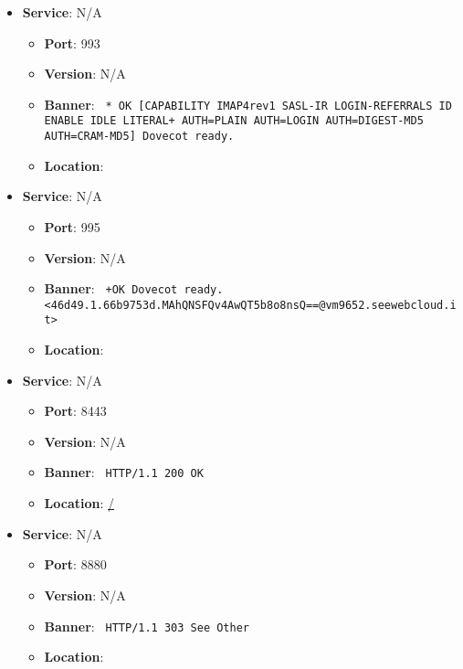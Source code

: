 \documentclass{article}
\begin{document}
\begin{itemize}
        \item \textbf{Service}: N/A
        \begin{itemize}
            \item \textbf{Port}: 993
            \item \textbf{Version}:  N/A 
            \item \textbf{Banner}: \texttt{
                * OK [CAPABILITY IMAP4rev1 SASL-IR LOGIN-REFERRALS ID ENABLE IDLE LITERAL+ AUTH=PLAIN AUTH=LOGIN AUTH=DIGEST-MD5 AUTH=CRAM-MD5] Dovecot ready.
            }
            \item \textbf{Location}: \href{  }{  }
        \end{itemize}
    
        \item \textbf{Service}: N/A
        \begin{itemize}
            \item \textbf{Port}: 995
            \item \textbf{Version}:  N/A 
            \item \textbf{Banner}: \texttt{
                +OK Dovecot ready. <46d49.1.66b9753d.MAhQNSFQv4AwQT5b8o8nsQ==@vm9652.seewebcloud.it>
            }
            \item \textbf{Location}: \href{  }{  }
        \end{itemize}
    
        \item \textbf{Service}: N/A
        \begin{itemize}
            \item \textbf{Port}: 8443
            \item \textbf{Version}:  N/A 
            \item \textbf{Banner}: \texttt{
                HTTP/1.1 200 OK
            }
            \item \textbf{Location}: \href{ / }{ / }
        \end{itemize}
    
        \item \textbf{Service}: N/A
        \begin{itemize}
            \item \textbf{Port}: 8880
            \item \textbf{Version}:  N/A 
            \item \textbf{Banner}: \texttt{
                HTTP/1.1 303 See Other
            }
            \item \textbf{Location}: \href{  }{  }
        \end{itemize}
    
\end{itemize}
\end{document}
